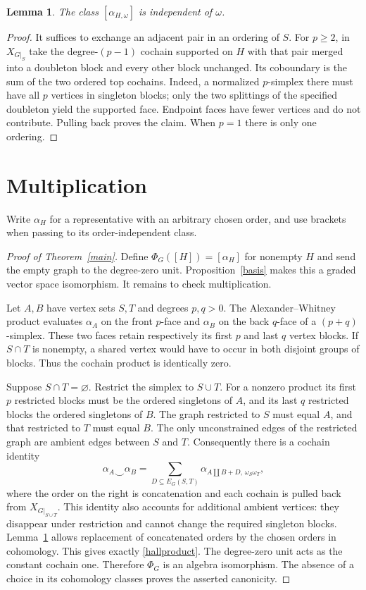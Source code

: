 \documentclass[11pt,a4paper]{article}
\newtheorem{lemma}[theorem]{Lemma}
\begin{document}
\begin{lemma}\label{order}
The class $[\alpha_{H,\omega}]$ is independent of $\omega$.
\end{lemma}
\begin{proof}
It suffices to exchange an adjacent pair in an ordering of $S$. For $p\ge2$,
in $X_{G|_S}$ take the degree-$(p-1)$ cochain supported on $H$ with that
pair merged into a doubleton block and every other block unchanged. Its
coboundary is the sum of the two ordered top cochains. Indeed, a normalized
$p$-simplex there must have all $p$ vertices in singleton blocks; only the
two splittings of the specified doubleton yield the supported face.
Endpoint faces have fewer vertices and do not contribute. Pulling back
proves the claim. When $p=1$ there is only one ordering.
\end{proof}

\section{Multiplication}
Write $\alpha_H$ for a representative with an arbitrary chosen order,
and use brackets when passing to its order-independent class.

\begin{proof}[Proof of Theorem~\ref{main}]
Define $\Phi_G([H])=[\alpha_H]$ for nonempty $H$ and send the empty graph
to the degree-zero unit. Proposition~\ref{basis} makes this a graded vector
space isomorphism. It remains to check multiplication.

Let $A,B$ have vertex sets $S,T$ and degrees $p,q>0$. The
Alexander--Whitney product evaluates $\alpha_A$ on the front $p$-face and
$\alpha_B$ on the back $q$-face of a $(p+q)$-simplex. These two faces
retain respectively its first $p$ and last $q$ vertex blocks. If $S\cap T$
is nonempty, a shared vertex would have to occur in both disjoint groups
of blocks. Thus the cochain product is identically zero.

Suppose $S\cap T=\varnothing$. Restrict the simplex to $S\cup T$. For a
nonzero product its first $p$ restricted blocks must be the ordered
singletons of $A$, and its last $q$ restricted blocks the ordered
singletons of $B$. The graph restricted to $S$ must equal $A$, and that
restricted to $T$ must equal $B$. The only unconstrained edges of the
restricted graph are ambient edges between $S$ and $T$. Consequently there
is a cochain identity
\[
 \alpha_A\smile\alpha_B
 =\sum_{D\subseteq E_G(S,T)}\alpha_{A\amalg B+D,\,\omega_S\omega_T},
\]
where the order on the right is concatenation and each cochain is pulled
back from $X_{G|_{S\cup T}}$. This identity also accounts for additional
ambient vertices: they disappear under restriction and cannot change
the required singleton blocks. Lemma~\ref{order} allows replacement of
concatenated orders by the chosen orders in cohomology. This gives exactly
\eqref{hallproduct}. The degree-zero unit acts as the constant cochain one.
Therefore $\Phi_G$ is an algebra isomorphism. The absence of a choice in
its cohomology classes proves the asserted canonicity.
\end{proof}
\end{document}

